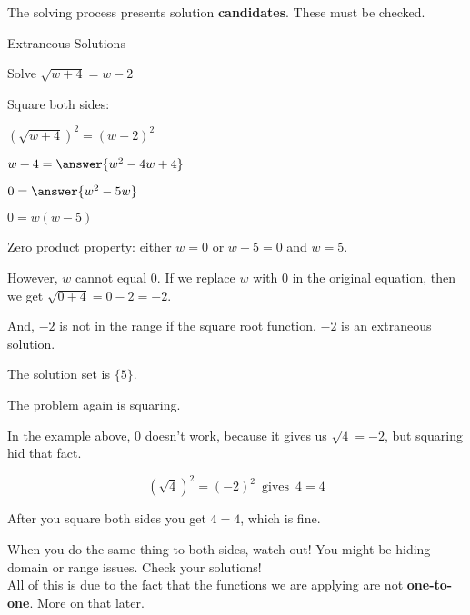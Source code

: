 \documentclass{ximera}
\begin{document}
The solving process presents solution \textbf{candidates}.  These must be checked.












\begin{example} Extraneous Solutions

Solve $\sqrt{w+4} = w - 2$


\begin{explanation}

Square both sides:



$(\sqrt{w+4})^2 = (w - 2)^2$


$w + 4 = \answer{w^2 - 4w + 4}$


$0 = \answer{w^2 - 5w}$

$0 = w(w-5) $


Zero product property:  either $w=0$ or $w-5=0$ and $w=5$.



However, $w$ cannot equal $0$.  If we replace $w$ with $0$ in the original equation, then we get $\sqrt{0+4} = 0 - 2 = -2$.

And, $-2$ is not in the range if the square root function. $-2$ is an extraneous solution.

The solution set is $\{ 5 \}$.

\end{explanation}

\end{example}


The problem again is squaring.

In the example above, $0$ doesn't work, because it gives us $\sqrt{4} = -2$, but squaring hid that fact.  


\[ (\sqrt{4})^2 = (-2)^2 \, \text{ gives } \, 4 = 4\]


After you square both sides you get $4 = 4$, which is fine.





When you do the same thing to both sides, watch out!  You might be hiding domain or range issues.  Check your solutions! \\




All of this is due to the fact that the functions we are applying are not \textbf{one-to-one}.  More on that later.
\end{document}
